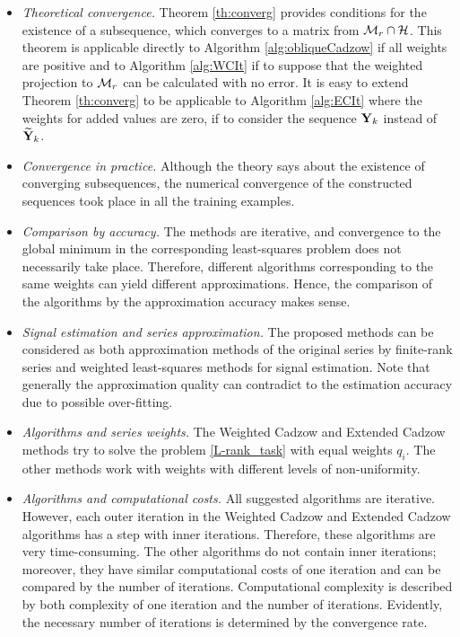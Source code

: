 \documentclass[sii]{ipart}
\begin{document}
	\begin{itemize}
		\item \textit{Theoretical convergence.}
		Theorem \ref{th:converg} provides conditions for the existence of a subsequence, which converges to a matrix from $\mathcal{M}_r \cap \mathcal{H}$. This theorem is applicable directly to Algorithm \ref{alg:obliqueCadzow} if all weights are positive and to Algorithm \ref{alg:WCIt} if to suppose that the weighted projection to $\mathcal{M}_r$ can be calculated with no error. It is easy to extend Theorem \ref{th:converg} to be applicable to Algorithm \ref{alg:ECIt} where the weights for added values are zero, if to consider the sequence  $\mathbf{Y}_k$ instead of $\widetilde{\mathbf{Y}}_k$.
		\item \textit{Convergence in practice.} Although the theory says about the existence of converging subsequences, the numerical convergence of the constructed sequences took place in all the training examples.
		\item \textit{Comparison by accuracy.}
		The methods are iterative, and convergence to the global minimum in the corresponding least-squares problem does not necessarily take place. Therefore, different algorithms corresponding to the same weights can yield different approximations. Hence, the comparison of the algorithms by the approximation accuracy makes sense.		
\item \textit{Signal estimation and series approximation.}
		The proposed methods can be considered as both approximation methods of the original series by finite-rank series and weighted least-squares methods for signal estimation. Note that generally the approximation quality can contradict to the estimation accuracy due to possible over-fitting.
		\item \textit{Algorithms and series weights.}
		The Weighted Cadzow and Extended Cadzow methods try to solve the problem \eqref{L-rank_task} with equal weights $q_i$. The other methods work with weights with different levels of non-uniformity.
		\item \textit{Algorithms and computational costs.}
		All suggested algorithms are iterative. However, each outer iteration in the Weighted Cadzow and Extended Cadzow algorithms has a step with inner iterations. Therefore, these algorithms are very time-consuming. The other algorithms do not contain inner iterations; moreover, they have similar computational costs of one iteration and can be compared by the number of iterations.
		Computational complexity is described by both complexity of one iteration and the number of iterations. Evidently, the necessary number of iterations is determined by the convergence rate.

\end{itemize}
\end{document}

